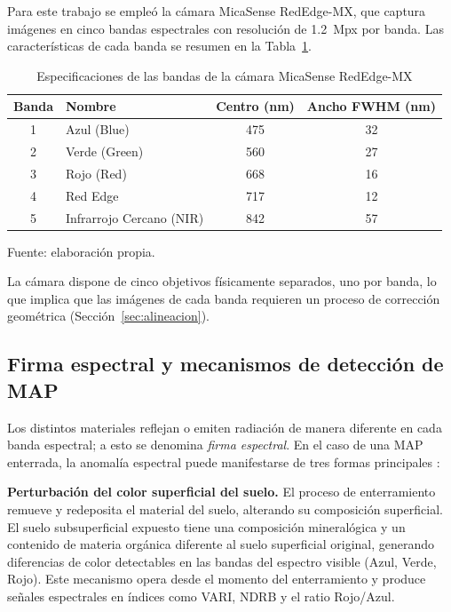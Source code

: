 Para este trabajo se empleó la cámara MicaSense RedEdge-MX, que captura
imágenes en cinco bandas espectrales con resolución de 1.2~Mpx por banda.
Las características de cada banda se resumen en la
Tabla~\ref{tab:bandas_micasense}.

\begin{table}[H]
\centering
\caption{Especificaciones de las bandas de la cámara MicaSense RedEdge-MX}
\label{tab:bandas_micasense}
\begin{tabular}{clcc}
\toprule
\textbf{Banda} & \textbf{Nombre} & \textbf{Centro (\si{nm})} &
\textbf{Ancho FWHM (\si{nm})} \\
\midrule
1 & Azul (Blue)              & 475 & 32 \\
2 & Verde (Green)            & 560 & 27 \\
3 & Rojo (Red)               & 668 & 16 \\
4 & Red Edge                 & 717 & 12 \\
5 & Infrarrojo Cercano (NIR) & 842 & 57 \\
\bottomrule
\end{tabular}

  {\footnotesize Fuente: elaboración propia.}
\end{table}

La cámara dispone de cinco objetivos físicamente separados, uno por banda,
lo que implica que las imágenes de cada banda requieren un proceso de
corrección geométrica (Sección~\ref{sec:alineacion}).

\subsection{Firma espectral y mecanismos de detección de MAP}

Los distintos materiales reflejan o emiten radiación de manera diferente
en cada banda espectral; a esto se denomina \textit{firma espectral}.
En el caso de una \ac{MAP} enterrada, la anomalía espectral puede
manifestarse de tres formas principales \cite{qiu2023,barnawi2022}:

\textbf{Perturbación del color superficial del suelo.} El proceso de
enterramiento remueve y redeposita el material del suelo, alterando su
composición superficial. El suelo subsuperficial expuesto tiene una
composición mineralógica y un contenido de materia orgánica diferente al
suelo superficial original, generando diferencias de color detectables en
las bandas del espectro visible (Azul, Verde, Rojo). Este mecanismo opera
desde el momento del enterramiento y produce señales espectrales en índices
como \ac{VARI}, \ac{NDRB} y el ratio Rojo/Azul.

